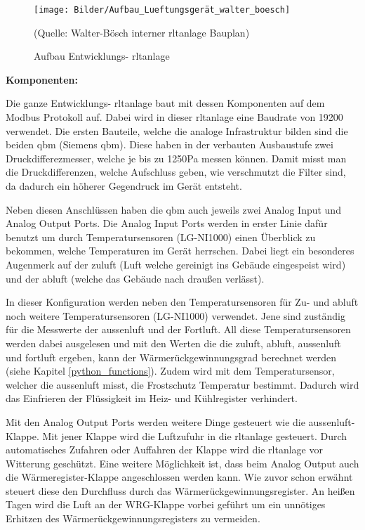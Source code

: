 \begin{figure}[H]
	\centering
	\texttt{[image: Bilder/Aufbau\_Lueftungsgerät\_walter\_boesch]}
	\caption{Aufbau Entwicklungs- \ac{rltanlage}} 
	(Quelle: Walter-Bösch interner \ac{rltanlage} Bauplan)
	\label{fig:Bauplan_entwicklung}
\end{figure}


\textbf{Komponenten:}

Die ganze Entwicklungs- \ac{rltanlage} baut mit dessen Komponenten auf dem Modbus Protokoll auf. Dabei wird in dieser \ac{rltanlage} eine Baudrate von 19200 verwendet. Die ersten Bauteile, welche die analoge Infrastruktur bilden sind die beiden \gls{qbm}  (Siemens \gls{qbm}). Diese haben in der verbauten Ausbaustufe zwei Druckdifferezmesser, welche je bis zu 1250Pa messen können. Damit misst man die Druckdifferenzen, welche Aufschluss geben, wie verschmutzt die Filter sind, da dadurch ein höherer Gegendruck im Gerät entsteht.

Neben diesen Anschlüssen haben die \gls{qbm}  auch jeweils zwei Analog Input und Analog Output Ports. Die Analog Input Ports werden in erster Linie dafür benutzt um durch Temperatursensoren (LG-NI1000) einen Überblick zu bekommen, welche Temperaturen im Gerät herrschen. Dabei liegt ein besonderes Augenmerk auf der \gls{zuluft} (Luft welche gereinigt ins Gebäude eingespeist wird) und der \gls{abluft} (welche das Gebäude nach draußen verlässt).

In dieser Konfiguration werden neben den Temperatursensoren für Zu- und \gls{abluft} noch weitere Temperatursensoren (LG-NI1000) verwendet. Jene sind zuständig für die Messwerte der \gls{aussenluft} und der Fortluft. All diese Temperatursensoren werden dabei ausgelesen und mit den Werten die die \gls{zuluft}, \gls{abluft}, \gls{aussenluft} und \gls{fortluft} ergeben, kann der Wärmerückgewinnungsgrad berechnet werden (siehe Kapitel \ref{python_functions}). Zudem wird mit dem Temperatursensor, welcher die \gls{aussenluft} misst, die Frostschutz Temperatur bestimmt. Dadurch wird das Einfrieren der Flüssigkeit im Heiz- und Kühlregister verhindert.

Mit den Analog Output Ports werden weitere Dinge gesteuert wie \zB die \gls{aussenluft}-Klappe. Mit jener Klappe wird die Luftzufuhr in die \ac{rltanlage} gesteuert. Durch automatisches Zufahren oder Auffahren der Klappe wird die \ac{rltanlage} vor Witterung geschützt. Eine weitere Möglichkeit ist, dass beim Analog Output auch die Wärmeregister-Klappe angeschlossen werden kann. Wie zuvor schon erwähnt steuert diese den Durchfluss durch das Wärmerückgewinnungsregister. An heißen Tagen wird die Luft an der WRG-Klappe vorbei geführt um ein unnötiges Erhitzen des Wärmerückgewinnungsregisters zu vermeiden.

